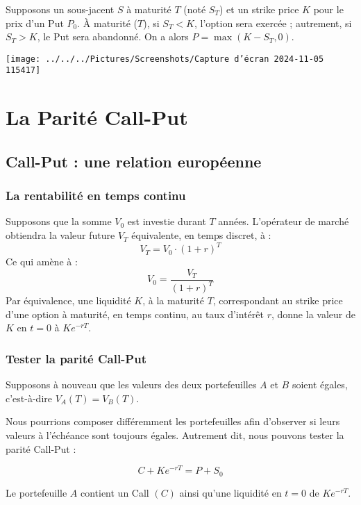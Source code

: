 \documentclass[a4paper, 12pt]{report}
\begin{document}
Supposons un sous-jacent \( S \) à maturité \( T \) (noté \( S_T \)) et un strike price \( K \) pour le prix d’un Put \( P_0 \). À maturité (\( T \)), si \( S_T < K \), l’option sera exercée ; autrement, si \( S_T > K \), le Put sera abandonné. On a alors \( P = \max(K - S_T, 0) \).

\begin{center}
	\texttt{[image: ../../../Pictures/Screenshots/Capture d'écran 2024-11-05 115417]}
\end{center}


\section{La Parité Call-Put}

\subsection{Call-Put : une relation européenne}

\subsubsection{La rentabilité en temps continu}

Supposons que la somme \( V_0 \) est investie durant \( T \) années. L’opérateur de marché obtiendra la valeur future \( V_T \) équivalente, en temps discret, à :
\[
V_T = V_0 \cdot (1 + r)^T 
\]
Ce qui amène à :
\[
V_0 = \frac{V_T}{(1 + r)^T} 
\]
Par équivalence, une liquidité \( K \), à la maturité \( T \), correspondant au strike price d’une option à maturité, en temps continu, au taux d’intérêt \( r \), donne la valeur de \( K \) en \( t = 0 \) à \( K e^{-rT} \).

\subsubsection{Tester la parité Call-Put}

Supposons à nouveau que les valeurs des deux portefeuilles \( A \) et \( B \) soient égales, c'est-à-dire \( V_A(T) = V_B(T) \).

Nous pourrions composer différemment les portefeuilles afin d’observer si leurs valeurs à l’échéance sont toujours égales. Autrement dit, nous pouvons tester la parité Call-Put :

\[
C + K e^{-rT} = P + S_0
\]

Le portefeuille \( A \) contient un Call \( (C) \) ainsi qu’une liquidité en \( t = 0 \) de \( K e^{-rT} \).
\end{document}
